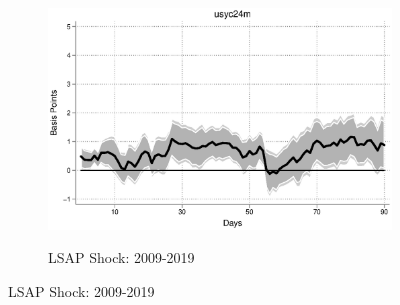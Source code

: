 \documentclass{article}
\begin{document}
\begin{figure}[tbph]
	\begin{subfigure}[t]{\textwidth}
		\begin{center}
			\includegraphics[trim={0cm 0cm 0cm 0cm},clip,height=0.26\textheight,width=1\textwidth]{../Figures/LPs/LagDep-FX/LSAP/US/usyc24m09-19lsap.eps} \\
			\caption{LSAP Shock: 2009-2019} \label{subfig:LPUS2Ylsap}
		\end{center}
	\end{subfigure}

\end{figure}

\pagebreak[4]
\end{document}

